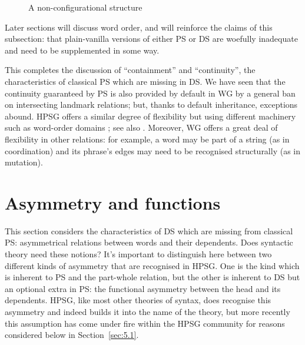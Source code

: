 \documentclass[output=paper
 	        ,biblatex
                ,babelshorthands
                ,newtxmath
                ,draftmode
                ,colorlinks, citecolor=brown
]{langscibook}
\begin{document}
\begin{figure}
	\caption{A non-configurational structure}
	\label{fig:13}
\end{figure}

Later sections will discuss word order, and will reinforce the claims of this subsection: that plain-vanilla versions of either PS or DS are woefully inadequate and need to be supplemented in some way.

This completes the discussion of ``containment'' and ``continuity'', the characteristics of classical PS which are missing in DS. We have seen that the continuity guaranteed by PS is also provided by default in WG by a general ban on intersecting landmark relations; but, thanks to default inheritance, exceptions abound. HPSG offers a similar degree of flexibility but using different machinery such as word-order domains \citep{Reape94a}; see also . Moreover, WG offers a great deal of flexibility in other relations: for example, a word may be part of a string (as in coordination) and its phrase’s edges may need to be recognised structurally (as in  mutation).


\section{Asymmetry and functions}
\label{sec:5}

This section considers the characteristics of DS which are missing from classical PS: asymmetrical relations between words and their dependents. Does syntactic theory need these notions? It’s important to distinguish here between two different kinds of asymmetry that are recognised in HPSG. One is the kind which is inherent to PS and the part-whole relation, but the other is inherent to DS but an optional extra in PS: the functional asymmetry between the head and its dependents. HPSG, like most other theories of syntax, does recognise this asymmetry and indeed builds it into the name of the theory, but more recently this assumption has come under fire within the HPSG community for reasons considered below in Section~\ref{sec:5.1}.
\end{document}
